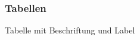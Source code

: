 \begin{frame}
    \frametitle{Tabellen}
    \begin{block}{Tabelle mit Beschriftung und Label}
        \begin{columns}
            \begin{column}{0.60\textwidth}
                
            \end{column}
            \pause
            \begin{column}{0.4\textwidth}
                \centering
                
            \end{column}
        \end{columns}
    \end{block}
\end{frame}
